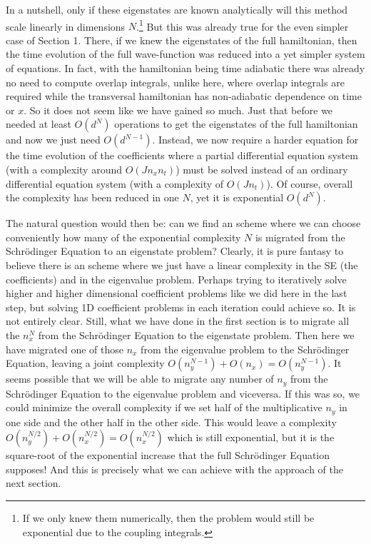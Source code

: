 \documentclass[11pt, a4paper]{article} %
\begin{document}
In a nutshell, only if these eigenstates are known analytically will this method scale linearly in dimensions $N$.\footnote{If we only knew them numerically, then the problem would still be exponential due to the coupling integrals.} But this was already true for the even simpler case of Section 1. There, if we knew the eigenstates of the full hamiltonian, then the time evolution of the full wave-function was reduced into a yet simpler system of equations. In fact, with the hamiltonian being time adiabatic there was already no need to compute overlap integrals, unlike here, where overlap integrals are required while the transversal hamiltonian has non-adiabatic dependence on time or $x$. So it does not seem like we have gained so much. Just that before we needed at least $O(d^N)$ operations to get the eigenstates of the full hamiltonian and now we just need $O(d^{N-1})$. Instead, we now require a harder equation for the time evolution of the coefficients where a partial differential equation system (with a complexity around $O(Jn_xn_t)$) must be solved instead of an ordinary differential equation system (with a complexity of $O(Jn_t)$). Of course, overall the complexity has been reduced in one $N$, yet it is exponential $O(d^N)$.

The natural question would then be: can we find an scheme where we can choose conveniently how many of the exponential complexity $N$ is migrated from the Schrödinger Equation to an eigenstate problem? Clearly, it is pure fantasy to believe there is an scheme where we just have a linear complexity in the SE (the coefficients) and in the eigenvalue problem. Perhaps trying to iteratively solve higher and higher dimensional coefficient problems like we did here in the last step, but solving 1D coefficient problems in each iteration could achieve so. It is not entirely clear. Still, what we have done in the first section is to migrate all the $n_x^N$ from the Schrödinger Equation to the eigenstate problem. Then here we have migrated one of those $n_x$ from the eigenvalue problem to the Schrödinger Equation, leaving a joint complexity $O(n_y^{N-1})+O(n_x)=O(n_y^{N-1})$. It seems possible that we will be able to migrate any number of $n_y$ from the Schrödinger Equation to the eigenvalue problem and viceversa. If this was so, we could minimize the overall complexity if we set half of the multiplicative $n_y$ in one side and the other half in the other side. This would leave a complexity $O(n_y^{N/2})+O(n_x^{N/2})=O(n_x^{N/2})$ which is still exponential, but it is the square-root of the exponential increase that the full Schrödinger Equation supposes! And this is precisely what we can achieve with the approach of the next section.
\newpage
\end{document}

